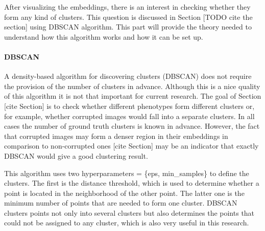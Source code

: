 After visualizing the embeddings, there is an interest in checking whether they form any kind of clusters. This question is discussed in Section [TODO cite the section] using DBSCAN algorithm. This part will provide the theory needed to understand how this algorithm works and how it can be set up.
\paragraph{DBSCAN}
A density-based algorithm for discovering clusters (DBSCAN) does not require the provision of the number of clusters in advance. Although this is a nice quality of this algorithm it is not that important for current research. The goal of Section [cite Section] is to check whether different phenotypes form different clusters or, for example, whether corrupted images would fall into a separate clusters. In all cases the number of ground truth clusters is known in advance. However, the fact that corrupted images may form a denser region in their embeddings in comparison to non-corrupted ones [cite Section] may be an indicator that exactly DBSCAN would give a good clustering result. 

This algorithm uses two hyperparameters = \{eps, min\_samples\} to define the clusters. The first is the distance threshold, which is used to determine whether a point is located in the neighborhood of the other point. The latter one is the minimum number of points that are needed to form one cluster. DBSCAN clusters points not only into several clusters but also determines the points that could not be assigned to any cluster, which is also very useful in this research.